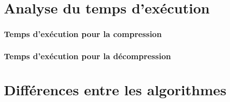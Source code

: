 \documentclass{report}
\begin{document}
\section*{Analyse du temps d’exécution}
\subsubsection*{Temps d’exécution pour la compression}
\subsubsection*{Temps d’exécution pour la décompression}


\section*{Différences entre les algorithmes}
\end{document}
